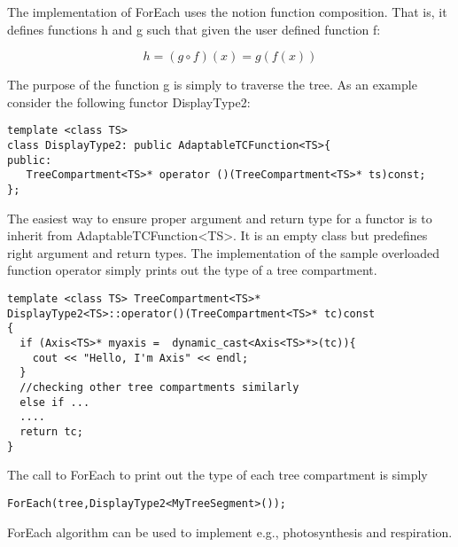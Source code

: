 The implementation of ForEach uses the notion function composition. 
That is, it defines  functions h and g such that given the user defined
function f:

\begin{displaymath}
h = (g \circ f)(x) = g(f(x))
\end{displaymath}

The purpose of the function g is simply to traverse the tree.
As an example consider the following functor DisplayType2:

\begin{verbatim}
template <class TS>
class DisplayType2: public AdaptableTCFunction<TS>{
public:
   TreeCompartment<TS>* operator ()(TreeCompartment<TS>* ts)const;
};
\end{verbatim}

The  easiest way  to  ensure proper  argument  and return  type for  a
functor is  to inherit from  AdaptableTCFunction<TS>.  It is  an empty
class   but  predefines   right   argument  and   return  types.   The
implementation  of  the  sample  overloaded function  operator  simply
prints out the type of a tree compartment.

\begin{verbatim}
template <class TS> TreeCompartment<TS>* 
DisplayType2<TS>::operator()(TreeCompartment<TS>* tc)const
{
  if (Axis<TS>* myaxis =  dynamic_cast<Axis<TS>*>(tc)){
    cout << "Hello, I'm Axis" << endl;
  }
  //checking other tree compartments similarly
  else if ...  
  ....
  return tc;
}
\end{verbatim}

The call to ForEach to print out the type of each tree compartment is
simply 

\begin{verbatim}
ForEach(tree,DisplayType2<MyTreeSegment>());
\end{verbatim}

ForEach algorithm  can be used  to implement e.g.,  photosynthesis and
respiration.
